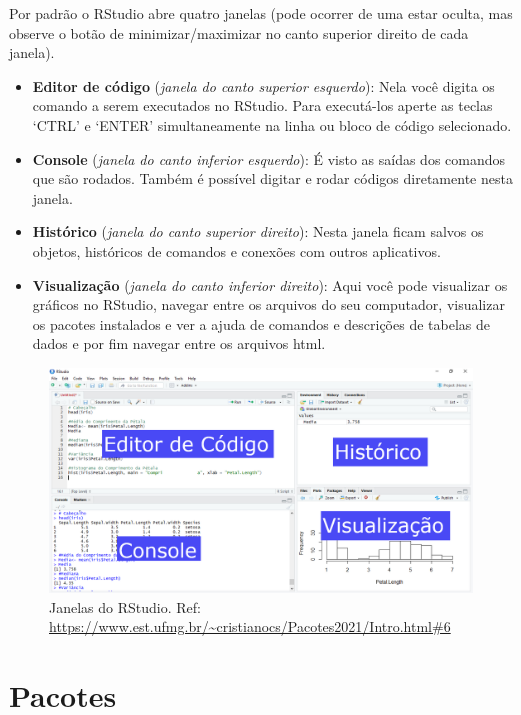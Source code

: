 \documentclass[
]{book}
\providecommand{\tightlist}{%
  \setlength{\itemsep}{0pt}\setlength{\parskip}{0pt}}
\theoremstyle{definition}
\theoremstyle{definition}
\theoremstyle{definition}
\theoremstyle{definition}
\theoremstyle{remark}
\begin{document}
Por padrão o RStudio abre quatro janelas (pode ocorrer de uma estar oculta, mas observe o botão de minimizar/maximizar no canto superior direito de cada janela).

\begin{itemize}
\tightlist
\item
  \textbf{Editor de código} (\emph{janela do canto superior esquerdo}): Nela você digita os comando a serem executados no RStudio. Para executá-los aperte as teclas `CTRL' e `ENTER' simultaneamente na linha ou bloco de código selecionado.
\item
  \textbf{Console} (\emph{janela do canto inferior esquerdo}): É visto as saídas dos comandos que são rodados. Também é possível digitar e rodar códigos diretamente nesta janela.
\item
  \textbf{Histórico} (\emph{janela do canto superior direito}): Nesta janela ficam salvos os objetos, históricos de comandos e conexões com outros aplicativos.
\item
  \textbf{Visualização} (\emph{janela do canto inferior direito}): Aqui você pode visualizar os gráficos no RStudio, navegar entre os arquivos do seu computador, visualizar os pacotes instalados e ver a ajuda de comandos e descrições de tabelas de dados e por fim navegar entre os arquivos html.
\end{itemize}

\begin{figure}
\centering
\includegraphics{figure/fig1_rstudio.png}
\caption{Janelas do RStudio. Ref: \url{https://www.est.ufmg.br/~cristianocs/Pacotes2021/Intro.html\#6}}
\end{figure}

\hypertarget{pacotes}{%
\section{Pacotes}\label{pacotes}}
\end{document}

